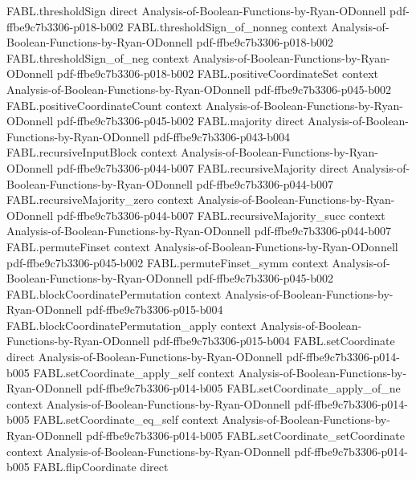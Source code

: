 \begin{theorem}
  {FABL.thresholdSign}
  {direct}
  {Analysis-of-Boolean-Functions-by-Ryan-ODonnell}
  {pdf-ffbe9c7b3306-p018-b002}
\proofstep
  {FABL.thresholdSign_of_nonneg}
  {context}
  {Analysis-of-Boolean-Functions-by-Ryan-ODonnell}
  {pdf-ffbe9c7b3306-p018-b002}
\proofstep
  {FABL.thresholdSign_of_neg}
  {context}
  {Analysis-of-Boolean-Functions-by-Ryan-ODonnell}
  {pdf-ffbe9c7b3306-p018-b002}
\proofstep
  {FABL.positiveCoordinateSet}
  {context}
  {Analysis-of-Boolean-Functions-by-Ryan-ODonnell}
  {pdf-ffbe9c7b3306-p045-b002}
\proofstep
  {FABL.positiveCoordinateCount}
  {context}
  {Analysis-of-Boolean-Functions-by-Ryan-ODonnell}
  {pdf-ffbe9c7b3306-p045-b002}
\proofstep
  {FABL.majority}
  {direct}
  {Analysis-of-Boolean-Functions-by-Ryan-ODonnell}
  {pdf-ffbe9c7b3306-p043-b004}
\proofstep
  {FABL.recursiveInputBlock}
  {context}
  {Analysis-of-Boolean-Functions-by-Ryan-ODonnell}
  {pdf-ffbe9c7b3306-p044-b007}
\proofstep
  {FABL.recursiveMajority}
  {direct}
  {Analysis-of-Boolean-Functions-by-Ryan-ODonnell}
  {pdf-ffbe9c7b3306-p044-b007}
\proofstep
  {FABL.recursiveMajority_zero}
  {context}
  {Analysis-of-Boolean-Functions-by-Ryan-ODonnell}
  {pdf-ffbe9c7b3306-p044-b007}
\proofstep
  {FABL.recursiveMajority_succ}
  {context}
  {Analysis-of-Boolean-Functions-by-Ryan-ODonnell}
  {pdf-ffbe9c7b3306-p044-b007}
\proofstep
  {FABL.permuteFinset}
  {context}
  {Analysis-of-Boolean-Functions-by-Ryan-ODonnell}
  {pdf-ffbe9c7b3306-p045-b002}
\proofstep
  {FABL.permuteFinset_symm}
  {context}
  {Analysis-of-Boolean-Functions-by-Ryan-ODonnell}
  {pdf-ffbe9c7b3306-p045-b002}
\proofstep
  {FABL.blockCoordinatePermutation}
  {context}
  {Analysis-of-Boolean-Functions-by-Ryan-ODonnell}
  {pdf-ffbe9c7b3306-p015-b004}
\proofstep
  {FABL.blockCoordinatePermutation_apply}
  {context}
  {Analysis-of-Boolean-Functions-by-Ryan-ODonnell}
  {pdf-ffbe9c7b3306-p015-b004}
\proofstep
  {FABL.setCoordinate}
  {direct}
  {Analysis-of-Boolean-Functions-by-Ryan-ODonnell}
  {pdf-ffbe9c7b3306-p014-b005}
\proofstep
  {FABL.setCoordinate_apply_self}
  {context}
  {Analysis-of-Boolean-Functions-by-Ryan-ODonnell}
  {pdf-ffbe9c7b3306-p014-b005}
\proofstep
  {FABL.setCoordinate_apply_of_ne}
  {context}
  {Analysis-of-Boolean-Functions-by-Ryan-ODonnell}
  {pdf-ffbe9c7b3306-p014-b005}
\proofstep
  {FABL.setCoordinate_eq_self}
  {context}
  {Analysis-of-Boolean-Functions-by-Ryan-ODonnell}
  {pdf-ffbe9c7b3306-p014-b005}
\proofstep
  {FABL.setCoordinate_setCoordinate}
  {context}
  {Analysis-of-Boolean-Functions-by-Ryan-ODonnell}
  {pdf-ffbe9c7b3306-p014-b005}
\proofstep
  {FABL.flipCoordinate}
  {direct}

\end{theorem}
